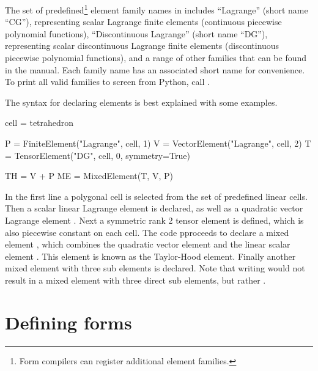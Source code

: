 The set of predefined\footnote{Form compilers can register additional
  element families.}  element family names in \ufl{} includes
``Lagrange'' (short name ``CG''), representing scalar Lagrange finite
elements (continuous piecewise polynomial functions), ``Discontinuous
Lagrange'' (short name ``DG''), representing scalar discontinuous
Lagrange finite elements (discontinuous piecewise polynomial
functions), and a range of other families that can be found in the
manual.  Each family name has an associated short name for
convenience.  To print all valid families to screen from Python, call
.

The syntax for declaring elements is best explained with some
examples.
\begin{code}
cell = tetrahedron

P = FiniteElement("Lagrange", cell, 1)
V = VectorElement("Lagrange", cell, 2)
T = TensorElement("DG", cell, 0, symmetry=True)

TH = V + P
ME = MixedElement(T, V, P)
\end{code}
In the first line a polygonal cell is selected from the set of
predefined linear cells.  Then a scalar linear Lagrange element
 is declared, as well as a quadratic vector Lagrange element
.  Next a symmetric rank 2 tensor element  is
defined, which is also piecewise constant on each cell.  The code
pproceeds to declare a mixed element , which combines the
quadratic vector element  and the linear scalar element
. This element is known as the Taylor-Hood element.  Finally
another mixed element with three sub elements is declared. Note that
writing  would not result in a mixed element with
three direct sub elements, but rather
.

\section{Defining forms}
\label{ufl:sec:forms}

